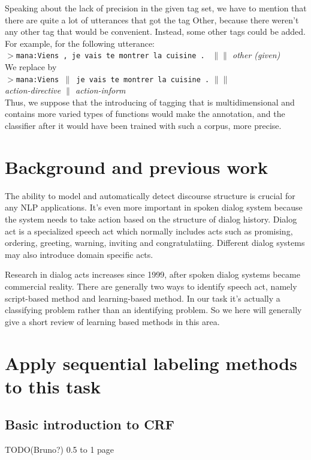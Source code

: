 \documentclass[a4paper]{article}
\begin{document}
Speaking about the lack of precision in the given tag set, we have to mention that there are quite a lot of utterances that got the tag Other, because there weren’t any other tag that would be convenient. Instead, some other tags could be added. For example, for the following utterance:\\
$>$\texttt{mana:Viens , je vais te montrer la cuisine . } \emph{\small $\|\|$ other (given)}\\
We replace by\\
$>$\texttt{mana:Viens $\|$ je vais te montrer la cuisine .} $\|\|$ \\
\emph{\small action-directive $\|$ action-inform}\\

Thus, we suppose that the introducing of tagging that is multidimensional and contains more varied types of functions would make the annotation, and the classifier after it would have been trained with such a corpus, more precise.\\


\section{Background and previous work}
The ability to model and automatically detect discourse structure is crucial for any NLP applications. It's even more important in spoken dialog system because the system needs to take action based on the structure of dialog history.
Dialog act is a specialized speech act which normally includes acts such as promising, ordering, greeting, warning, inviting and congratulatiing. Different dialog systems may also introduce domain specific acts. 

Research in dialog acts increases since 1999, after spoken dialog  systems became commercial reality. There are generally two ways to identify speech act, namely script-based method and learning-based method. In our task it's actually a classifying problem rather than an identifying problem. So we here will generally give a short review of learning based methods in this area.

\section{Apply sequential labeling methods to this task}
\subsection{Basic introduction to CRF}
TODO(Bruno?)
0.5 to 1 page
\end{document}
